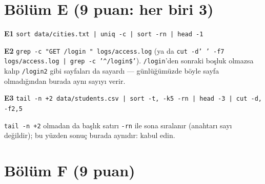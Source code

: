 \section*{Bölüm E (9 puan: her biri 3)}
\textbf{E1} \texttt{sort data/cities.txt | uniq -c | sort -rn | head -1}

\textbf{E2} \texttt{grep -c "GET /login " logs/access.log} (ya da \texttt{cut -d' ' -f7 logs/access.log | grep -c '\^{}/login\$'}). \texttt{/login}'den sonraki boşluk olmazsa kalıp \texttt{/login2} gibi sayfaları da sayardı --- günlüğümüzde böyle sayfa olmadığından burada aynı sayıyı verir.

\textbf{E3} \texttt{tail -n +2 data/students.csv | sort -t, -k5 -rn | head -3 | cut -d, -f2,5}

\texttt{tail -n +2} olmadan da başlık satırı \texttt{-rn} ile sona sıralanır (anahtarı sayı değildir); bu yüzden sonuç burada aynıdır: kabul edin.

\section*{Bölüm F (9 puan)}


